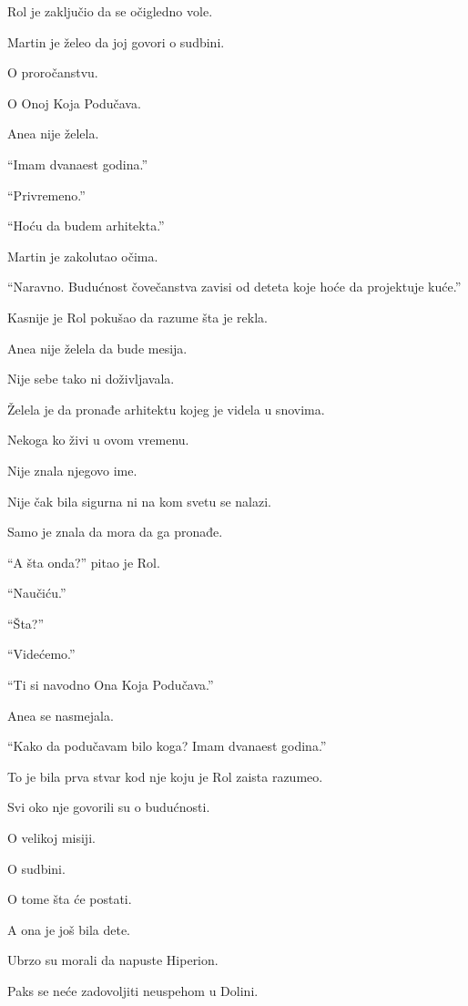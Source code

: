 Rol je zaključio da se očigledno vole.

\bigskip

Martin je želeo da joj govori o sudbini.

O proročanstvu.

O Onoj Koja Podučava.

Anea nije želela.

``Imam dvanaest godina.''

``Privremeno.''

``Hoću da budem arhitekta.''

Martin je zakolutao očima.

``Naravno. Budućnost čovečanstva zavisi od deteta koje hoće da projektuje kuće.''

\bigskip

Kasnije je Rol pokušao da razume šta je rekla.

Anea nije želela da bude mesija.

Nije sebe tako ni doživljavala.

Želela je da pronađe arhitektu kojeg je videla u snovima.

Nekoga ko živi u ovom vremenu.

Nije znala njegovo ime.

Nije čak bila sigurna ni na kom svetu se nalazi.

Samo je znala da mora da ga pronađe.

\bigskip

``A šta onda?'' pitao je Rol.

``Naučiću.''

``Šta?''

``Videćemo.''

``Ti si navodno Ona Koja Podučava.''

Anea se nasmejala.

``Kako da podučavam bilo koga? Imam dvanaest godina.''

\bigskip

To je bila prva stvar kod nje koju je Rol zaista razumeo.

Svi oko nje govorili su o budućnosti.

O velikoj misiji.

O sudbini.

O tome šta će postati.

A ona je još bila dete.

\bigskip

Ubrzo su morali da napuste Hiperion.

Paks se neće zadovoljiti neuspehom u Dolini.

